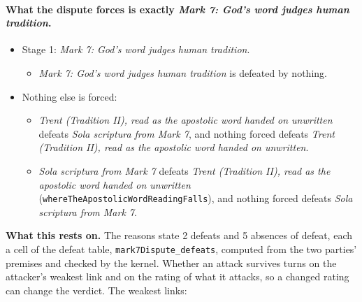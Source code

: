 \documentclass[11pt]{article}
\begin{document}
\paragraph{What the dispute forces is exactly \emph{Mark 7: God's word judges human tradition}.}
\begin{itemize}
\item Stage 1: \emph{Mark 7: God's word judges human tradition}.
\begin{itemize}
\item \emph{Mark 7: God's word judges human tradition} is defeated by nothing.
\end{itemize}
\item Nothing else is forced:
\begin{itemize}
\item \emph{Trent (Tradition II), read as the apostolic word handed on unwritten} defeats \emph{Sola scriptura from Mark 7}, and nothing forced defeats \emph{Trent (Tradition II), read as the apostolic word handed on unwritten}.
\item \emph{Sola scriptura from Mark 7} defeats \emph{Trent (Tradition II), read as the apostolic word handed on unwritten} (\texttt{where\allowbreak{}The\allowbreak{}Apostolic\allowbreak{}Word\allowbreak{}Reading\allowbreak{}Falls}), and nothing forced defeats \emph{Sola scriptura from Mark 7}.
\end{itemize}
\end{itemize}
\par\noindent\textbf{What this rests on.} The reasons state 2 defeats and 5 absences of defeat, each a cell of the defeat table, \texttt{mark7\allowbreak{}Dispute\_\allowbreak{}defeats}, computed from the two parties' premises and checked by the kernel. Whether an attack survives turns on the attacker's weakest link and on the rating of what it attacks, so a changed rating can change the verdict. The weakest links:
\end{document}
